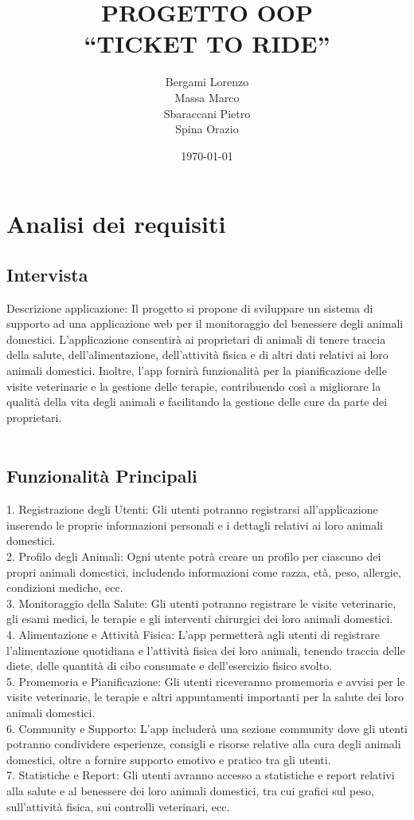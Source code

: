 \documentclass[a4paper,12pt]{report}
\title{PROGETTO OOP\\``TICKET TO RIDE''}
\author{Bergami Lorenzo\\
Massa Marco\\
Sbaraccani Pietro\\
Spina Orazio}
\date{\today}
\begin{document}
\maketitle

\tableofcontents
\chapter{Analisi dei requisiti}
\section{Intervista}
Descrizione applicazione:
Il progetto si propone di sviluppare un sistema di supporto ad una applicazione web per il monitoraggio del benessere degli animali domestici. L'applicazione consentirà ai proprietari di animali di tenere traccia della salute, dell'alimentazione, dell'attività fisica e di altri dati relativi ai loro animali domestici. Inoltre, l'app fornirà funzionalità per la pianificazione delle visite veterinarie e la gestione delle terapie, contribuendo così a migliorare la qualità della vita degli animali e facilitando la gestione delle cure da parte dei proprietari.\\\\
\section{Funzionalità Principali}
1.	Registrazione degli Utenti: Gli utenti potranno registrarsi all'applicazione inserendo le proprie informazioni personali e i dettagli relativi ai loro animali domestici.\\
2.	Profilo degli Animali: Ogni utente potrà creare un profilo per ciascuno dei propri animali domestici, includendo informazioni come razza, età, peso, allergie, condizioni mediche, ecc.\\
3.	Monitoraggio della Salute: Gli utenti potranno registrare le visite veterinarie, gli esami medici, le terapie e gli interventi chirurgici dei loro animali domestici.\\
4.	Alimentazione e Attività Fisica: L'app permetterà agli utenti di registrare l'alimentazione quotidiana e l'attività fisica dei loro animali, tenendo traccia delle diete, delle quantità di cibo consumate e dell'esercizio fisico svolto.\\
5.	Promemoria e Pianificazione: Gli utenti riceveranno promemoria e avvisi per le visite veterinarie, le terapie e altri appuntamenti importanti per la salute dei loro animali domestici.\\
6.	Community e Supporto: L'app includerà una sezione community dove gli utenti potranno condividere esperienze, consigli e risorse relative alla cura degli animali domestici, oltre a fornire supporto emotivo e pratico tra gli utenti.\\
7.	Statistiche e Report: Gli utenti avranno accesso a statistiche e report relativi alla salute e al benessere dei loro animali domestici, tra cui grafici sul peso, sull'attività fisica, sui controlli veterinari, ecc.\\\\
\end{document}
